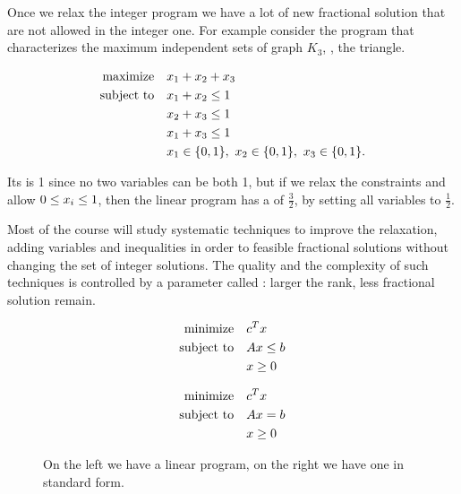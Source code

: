 \documentclass[a4paper,twoside,justified]{tufte-handout}
\begin{document}
Once we relax the integer program we have a lot of new fractional
solution that are not allowed in the integer one. For example consider
the program that characterizes the maximum independent sets of graph $
K_{3} $, \ie, the triangle.

\begin{alignat}{2}
  \maximize x_{1} + x_{2} + x_{3} \notag\\
  \subjectto   x_{1} + x_{2} \leq 1 \notag\\
             & x_{2} + x_{3} \leq 1 \label{eq:triangle-ind-set}\\
             & x_{1} + x_{3} \leq 1 \notag\\
             & \varboolean{x_{1}},\ \varboolean{x_{2}},\ \varboolean{x_{3}}.\notag
\end{alignat}

Its  is 1 since no two variables can be
both 1, but if we relax the constraints and allow $ \varbounded{x_{i}}
$, then the linear program has a 
of $ \frac{3}{2} $, by setting all variables to $\frac{1}{2}$.

Most of the course will study systematic techniques to improve the
relaxation, adding variables and inequalities in order to
 feasible fractional solutions without changing
the set of integer solutions. The quality and the complexity of such
techniques is controlled by a parameter called :
larger the rank, less fractional solution remain.

\begin{figure}

\begin{minipage}{0.45\textwidth}
\begin{alignat*}{2}
  \text{minimize}\hspace{1em}& c^{T}x \\
  \text{subject to}\hspace{1em}& Ax \leq b\\
  & x \geq 0
\end{alignat*}
\end{minipage}
\vrule
\begin{minipage}{0.45\textwidth}
\begin{alignat*}{2}
  \text{minimize}\hspace{1em}& c^{T}x \\
  \text{subject to}\hspace{1em}& Ax = b\\
  & x \geq 0
\end{alignat*}
\end{minipage}
\caption{On the left we have a linear program, on the right we have
  one in standard form.}
\end{figure}
\end{document}
